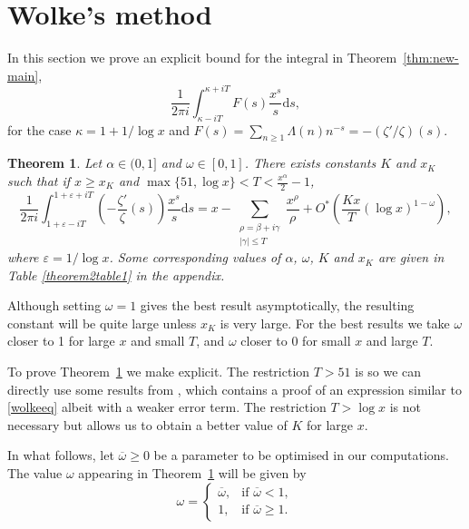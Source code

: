 \documentclass[reqno]{amsart}
\newtheorem{theorem}{Theorem}[section]
\numberwithin{equation}{section}
\theoremstyle{remark}
\begin{document}
\section{Wolke's method}\label{wolkesect}
In this section we prove an explicit bound for the integral in Theorem~\ref{thm:new-main},
\begin{equation*}
    \frac{1}{2\pi i}\int_{\kappa-iT}^{\kappa+iT}F(s)\frac{x^s}{s}\mathrm{d}s,
\end{equation*}
for the case $\kappa=1+1/\log x$ and $F(s)=\sum_{n\geq 1}\Lambda(n) n^{-s} = -(\zeta'/\zeta)(s)$.
\begin{theorem}\label{wolkeprop}
    Let $\alpha\in(0,1]$ and $\omega\in[0,1]$. There exists constants $K$ and $x_K$ such that if $x\geq x_K$ and $\max\{51,\log x\}<T<\frac{x^{\alpha}}{2}-1$, 
    \begin{equation}\label{wolkeeq}
        \frac{1}{2\pi i}\int_{1+\varepsilon-iT}^{1+\varepsilon+iT}\left(-\frac{\zeta'}{\zeta}(s)\right) \frac{x^s}{s}\mathrm{d}s = x-\sum_{\substack{\rho=\beta+i\gamma\\|\gamma|\leq T}}\frac{x^\rho}{\rho}+O^*\left(\frac{Kx}{T}(\log x)^{1-\omega}\right),
    \end{equation}
    where $\varepsilon=1/\log x$. Some corresponding values of $\alpha$, $\omega$, $K$ and $x_K$ are given in Table \ref{theorem2table1} in the appendix.
\end{theorem}
Although setting $\omega=1$ gives the best result asymptotically, the resulting constant will be quite large unless $x_K$ is very large. For the best results we take $\omega$ closer to 1 for large $x$ and small $T$, and $\omega$ closer to 0 for small $x$ and large $T$.

To prove Theorem~\ref{wolkeprop} we make \cite[Theorem 2]{Wolke_1983} explicit. The restriction $T>51$ is so we can directly use some results from \cite{Dudek_16p}, which contains a proof of an expression similar to \eqref{wolkeeq} albeit with a weaker error term. The restriction $T>\log x$ is not necessary but allows us to obtain a better value of $K$ for large $x$.

In what follows, let $\overline{\omega}\geq 0$ be a parameter to be optimised in our computations. The value $\omega$ appearing in Theorem~\ref{wolkeprop} will be given by
\begin{equation*}
    \omega=
    \begin{cases}
        \overline{\omega},&\text{if $\overline{\omega}<1$},\\
        1,&\text{if $\overline{\omega}\geq 1$}.
    \end{cases}
\end{equation*}
\end{document}
